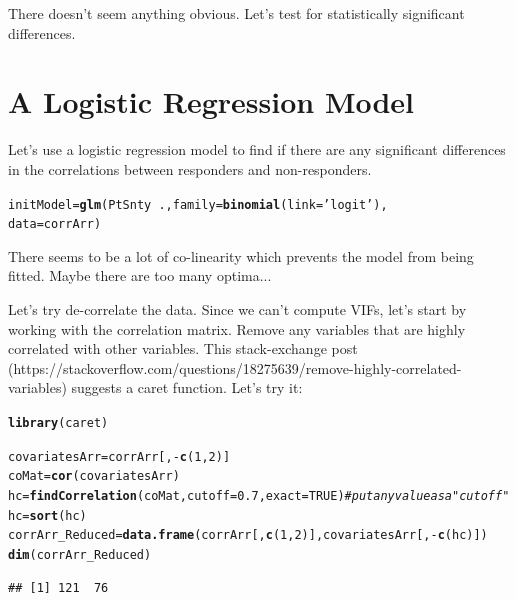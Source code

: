 \documentclass[a4paper]{article}\usepackage[]{graphicx}\usepackage[]{color}
\makeatletter
\newcommand{\hlnum}[1]{\textcolor[rgb]{0.686,0.059,0.569}{#1}}%
\newcommand{\hlstr}[1]{\textcolor[rgb]{0.192,0.494,0.8}{#1}}%
\newcommand{\hlcom}[1]{\textcolor[rgb]{0.678,0.584,0.686}{\textit{#1}}}%
\newcommand{\hlopt}[1]{\textcolor[rgb]{0,0,0}{#1}}%
\newcommand{\hlstd}[1]{\textcolor[rgb]{0.345,0.345,0.345}{#1}}%
\newcommand{\hlkwb}[1]{\textcolor[rgb]{0.69,0.353,0.396}{#1}}%
\newcommand{\hlkwc}[1]{\textcolor[rgb]{0.333,0.667,0.333}{#1}}%
\newcommand{\hlkwd}[1]{\textcolor[rgb]{0.737,0.353,0.396}{\textbf{#1}}}%
\newenvironment{kframe}{%
 \def\at@end@of@kframe{}%
 \ifinner\ifhmode%
  \def\at@end@of@kframe{\end{minipage}}%
  \begin{minipage}{\columnwidth}%
 \fi\fi%
 \def\FrameCommand##1{\hskip\@totalleftmargin \hskip-\fboxsep
 \colorbox{shadecolor}{##1}\hskip-\fboxsep
     \hskip-\linewidth \hskip-\@totalleftmargin \hskip\columnwidth}%
 \MakeFramed {\advance\hsize-\width
   \@totalleftmargin\z@ \linewidth\hsize
   \@setminipage}}%
 {\par\unskip\endMakeFramed%
 \at@end@of@kframe}
\newenvironment{knitrout}{}{} %
\makeatother
\begin{document}
There doesn't seem anything obvious.
Let's test for statistically significant differences.


\section{A Logistic Regression Model}
Let's use a logistic regression model to find if there are any significant differences in the correlations between responders and non-responders.

\begin{knitrout}
\color{fgcolor}\begin{kframe}
\begin{alltt}
\hlstd{initModel} \hlkwb{=} \hlkwd{glm}\hlstd{(PtSnty} \hlopt{~}\hlstd{.,}\hlkwc{family}\hlstd{=}\hlkwd{binomial}\hlstd{(}\hlkwc{link}\hlstd{=}\hlstr{'logit'}\hlstd{),}
                \hlkwc{data}\hlstd{=corrArr)}
\end{alltt}


{\ttfamily\noindent\color{warningcolor}{\#\# Warning: glm.fit: algorithm did not converge}}\end{kframe}
\end{knitrout}

There seems to be a lot of co-linearity which prevents the model from being fitted. Maybe there are too many optima...

Let's try de-correlate the data. Since we can't compute VIFs, let's start by working with the correlation matrix. Remove any variables that are highly correlated with other variables. This stack-exchange post (https://stackoverflow.com/questions/18275639/remove-highly-correlated-variables) suggests a caret function. Let's try it:

\begin{knitrout}
\color{fgcolor}\begin{kframe}
\begin{alltt}
\hlkwd{library}\hlstd{(caret)}
\end{alltt}


{\ttfamily\noindent\itshape\color{messagecolor}{\#\# Loading required package: lattice}}\begin{alltt}
\hlstd{covariatesArr} \hlkwb{=} \hlstd{corrArr[,}\hlopt{-}\hlkwd{c}\hlstd{(}\hlnum{1}\hlstd{,}\hlnum{2}\hlstd{)]}
\hlstd{coMat} \hlkwb{=} \hlkwd{cor}\hlstd{(covariatesArr)}
\hlstd{hc} \hlkwb{=} \hlkwd{findCorrelation}\hlstd{(coMat,}\hlkwc{cutoff}\hlstd{=}\hlnum{0.7}\hlstd{,}\hlkwc{exact}\hlstd{=}\hlnum{TRUE}\hlstd{)} \hlcom{# put any value as a "cutoff" }
\hlstd{hc} \hlkwb{=} \hlkwd{sort}\hlstd{(hc)}
\hlstd{corrArr_Reduced} \hlkwb{=} \hlkwd{data.frame}\hlstd{(corrArr[,}\hlkwd{c}\hlstd{(}\hlnum{1}\hlstd{,}\hlnum{2}\hlstd{)],covariatesArr[,}\hlopt{-}\hlkwd{c}\hlstd{(hc)])}
\hlkwd{dim}\hlstd{(corrArr_Reduced)}
\end{alltt}
\begin{verbatim}
## [1] 121  76
\end{verbatim}
\end{kframe}
\end{knitrout}
\end{document}

